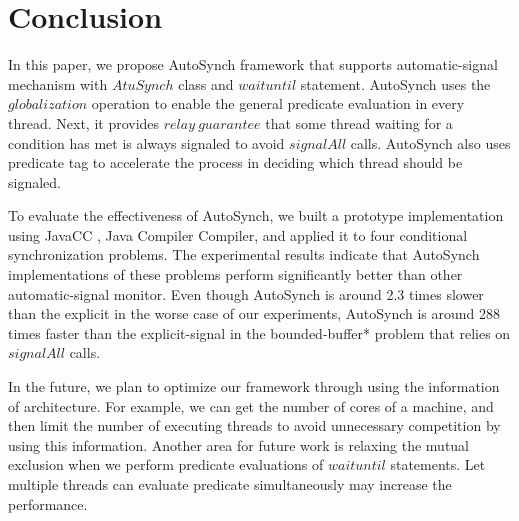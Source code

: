 \documentclass[preprint]{sigplanconf}
\begin{document}
\section{Conclusion} \label{sec:conclu}
In this paper, we propose AutoSynch framework that supports 
automatic-signal mechanism with $AtuSynch$ class and $waituntil$ statement.
AutoSynch uses the $globalization$ operation to enable the general predicate 
evaluation in every thread. Next, it provides $relay\ guarantee$ that some
thread waiting for a condition has met is always signaled to avoid $signalAll$
calls. AutoSynch also uses predicate tag to accelerate the process in deciding
which thread should be signaled. 

To evaluate the effectiveness of AutoSynch, we built a prototype implementation
using JavaCC \cite{kod04}, Java Compiler Compiler,  and applied it to four
conditional synchronization problems. The experimental results indicate that 
AutoSynch implementations of these problems perform significantly better than
other automatic-signal monitor. Even though AutoSynch is around 2.3 times 
slower than the explicit in the worse case of our experiments, AutoSynch is
around 288 times faster than the explicit-signal in the bounded-buffer* problem 
that relies on $signalAll$ calls. 

In the future, we plan to optimize our framework through using the information 
of architecture. For example, we can get the number of cores of a machine, and
then limit the number of executing threads to avoid unnecessary competition by
using this information. Another area for future work is relaxing the mutual
exclusion when we perform predicate evaluations of $waituntil$ statements. Let
multiple threads can evaluate predicate simultaneously may increase the
performance. 

\end{document}
